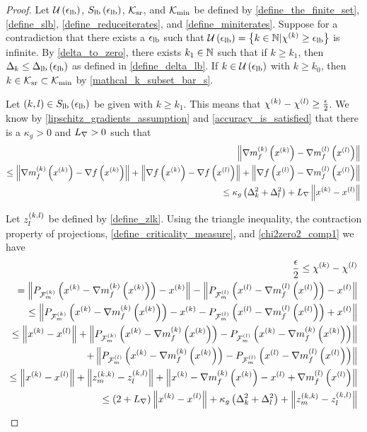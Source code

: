 \begin{proof}
Let $\ulb$, $\slb$, $\reduceiterates$, and $\miniterates$ be defined by 
\cref{define_the_finite_set}, \cref{define_slb}, \cref{define_reduceiterates}, and \cref{define_miniterates}.
Suppose for a contradiction that there exists a $\elb$ such that $\ulb = \left\{k \in \naturals | \chik \ge \elb \right\}$ is infinite.
By \cref{delta_to_zero}, there exists $k_1 \in \naturals$ such that if $k \ge k_1$, then $\dk \le \dlb$ as defined in \cref{define_delta_lb}.
If $k \in \ulb$ with $k \ge k_0$, then $k \in \reduceiterates \subset \miniterates$ by \cref{mathcal_k_subset_bar_s}.

Let $(k, l) \in \slb$ be given with $k \ge k_1$.
This means that $\chik - \chi^{(l)} \ge \frac {\epsilon} 2 $.
We know by \cref{lipschitz_gradients_assumption} and \cref{accuracy_is_satisfied} that there is a $\kappa_g > 0$ and $\lipgrad>0$ such that
\begin{align}
\left\|\gk - \gl\right\| \nonumber \\
\le \left\|\gk - \gradf\left(\xk\right)\right\| 
+ \left\|\gradf\left(\xk\right) - \gradf\left(\xl\right)\right\| 
+ \left\|\gradf\left(\xl\right) - \gl \right\| \nonumber \\
\le \kappa_g \left(\dk^2 + \dl^2\right) + \lipgrad \left\|\xk - \xl \right\| \label{chi2zero2_comp1}
\end{align}


Let $\zlk$ be defined by \cref{define_zlk}.
Using the triangle inequality, the contraction property of projections, 
\cref{define_criticality_measure}, and \cref{chi2zero2_comp1} we have 
\begin{align*}
\frac{\epsilon}{2} \le \chik - \chi^{(l)} \\
=     \left\|P_{\feasiblek}\left(\xk - \gk\right) - \xk\right \| 
    - \left\|P_{\feasiblel}\left(\xl - \gl\right) - \xl\right \| \\
\le   \left\|P_{\feasiblek}\left(\xk - \gk\right) - \xk
    -  P_{\feasiblel}\left(\xl - \gl\right) + \xl\right \| \\
 \le  \left\|\xk - \xl\right\|
 + \left\|P_{\feasiblek}\left(\xk - \gk\right) -  P_{\feasiblel}\left(\xk - \gk\right) \right\| \\
 + \left\|P_{\feasiblel}\left(\xk - \gk\right) -  P_{\feasiblel}\left(\xl - \gl\right) \right\| \\
\le \left\|\xk - \xl\right\| + \left\|\zmk - \zlk\right\| 
+ \left\| \xk - \gk - \xl + \gl  \right\| \\
\le \left(2 + \lipgrad\right) \left\|\xk - \xl\right\| 
+ \kappa_g \left(\dk^2 + \dl^2\right)
+ \left\|\zmk - \zlk\right\|
\end{align*}
        

\end{proof}
